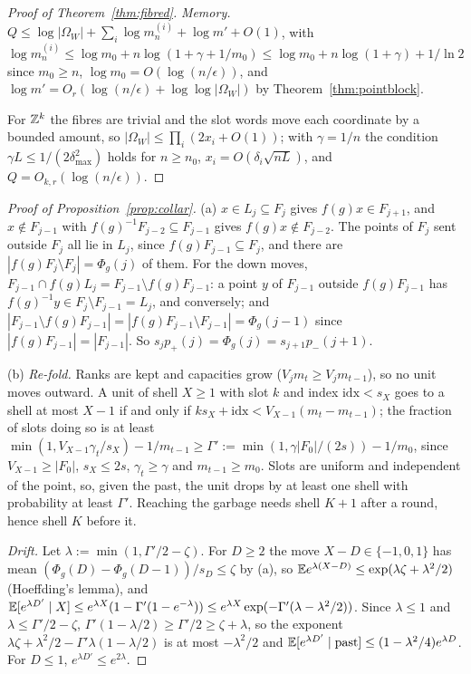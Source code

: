 \begin{proof}[Proof of Theorem~\ref{thm:fibred}]
\emph{Memory.} $Q\le\log|\Omega_W|+\sum_i\log m^{(i)}_n+\log m'+O(1)$, with $\log m^{(i)}_n\le\log m_0+n\log(1+\gamma+1/m_0)\le\log m_0+n\log(1+\gamma)+1/\ln2$ since $m_0\ge n$,
$\log m_0=O(\log(n/\epsilon))$, and $\log m'=O_r(\log(n/\epsilon)+\log\log|\Omega_W|)$ by Theorem~\ref{thm:pointblock}.

For $\mathbb Z^k$ the fibres are trivial and the slot words move each coordinate by a bounded amount, so $|\Omega_W|\le\prod_i(2x_i+O(1))$; with $\gamma=1/n$ the condition
$\gamma L\le1/(2\delta_{\max}^2)$ holds for $n\ge n_0$, $x_i=O(\delta_i\sqrt{nL})$, and $Q=O_{k,r}(\log(n/\epsilon))$.
\end{proof}

\begin{proof}[Proof of Proposition~\ref{prop:collar}]
(a) $x\in L_j\subseteq F_j$ gives $f(g)x\in F_{j+1}$, and $x\notin F_{j-1}$ with $f(g)^{-1}F_{j-2}\subseteq F_{j-1}$ gives $f(g)x\notin F_{j-2}$. The points of $F_j$ sent outside $F_j$
all lie in $L_j$, since $f(g)F_{j-1}\subseteq F_j$, and there are $|f(g)F_j\setminus F_j|=\Phi_g(j)$ of them. For the down moves, $F_{j-1}\cap f(g)L_j=F_{j-1}\setminus f(g)F_{j-1}$: a
point $y$ of $F_{j-1}$ outside $f(g)F_{j-1}$ has $f(g)^{-1}y\in F_j\setminus F_{j-1}=L_j$, and conversely; and $|F_{j-1}\setminus f(g)F_{j-1}|=|f(g)F_{j-1}\setminus F_{j-1}|=\Phi_g(j-1)$
since $|f(g)F_{j-1}|=|F_{j-1}|$. So $s_jp_+(j)=\Phi_g(j)=s_{j+1}p_-(j+1)$.

(b) \emph{Re-fold.} Ranks are kept and capacities grow ($V_jm_t\ge V_jm_{t-1}$), so no unit moves outward. A unit of shell $X\ge1$ with slot $k$ and index $\mathrm{idx}<s_X$ goes
to a shell at most $X-1$ if and only if $ks_X+\mathrm{idx}<V_{X-1}(m_t-m_{t-1})$; the fraction of slots doing so is at least
$\min(1,V_{X-1}\gamma_t/s_X)-1/m_{t-1}\ge\Gamma':=\min(1,\gamma|F_0|/(2s))-1/m_0$, since $V_{X-1}\ge|F_0|$, $s_X\le2s$, $\gamma_t\ge\gamma$ and $m_{t-1}\ge m_0$. Slots are uniform
and independent of the point, so, given the past, the unit drops by at least one shell with probability at least $\Gamma'$. Reaching the garbage needs shell $K+1$ after a
round, hence shell $K$ before it.

\emph{Drift.} Let $\lambda:=\min(1,\Gamma'/2-\zeta)$. For $D\ge2$ the move $X-D\in\{-1,0,1\}$ has mean $(\Phi_g(D)-\Phi_g(D-1))/s_D\le\zeta$ by (a), so
$\mathbb E e^{\lambda(X-D)}\le\exp(\lambda\zeta+\lambda^2/2)$ (Hoeffding's lemma), and $\mathbb E[e^{\lambda D'}\mid X]\le e^{\lambda X}(1-\Gamma'(1-e^{-\lambda}))\le e^{\lambda X}\exp(-\Gamma'(\lambda-\lambda^2/2))$.
Since $\lambda\le1$ and $\lambda\le\Gamma'/2-\zeta$, $\Gamma'(1-\lambda/2)\ge\Gamma'/2\ge\zeta+\lambda$, so the exponent $\lambda\zeta+\lambda^2/2-\Gamma'\lambda(1-\lambda/2)$ is at most
$-\lambda^2/2$ and $\mathbb E[e^{\lambda D'}\mid\text{past}]\le(1-\lambda^2/4)e^{\lambda D}$. For $D\le1$, $e^{\lambda D'}\le e^{2\lambda}$.


\end{proof}
